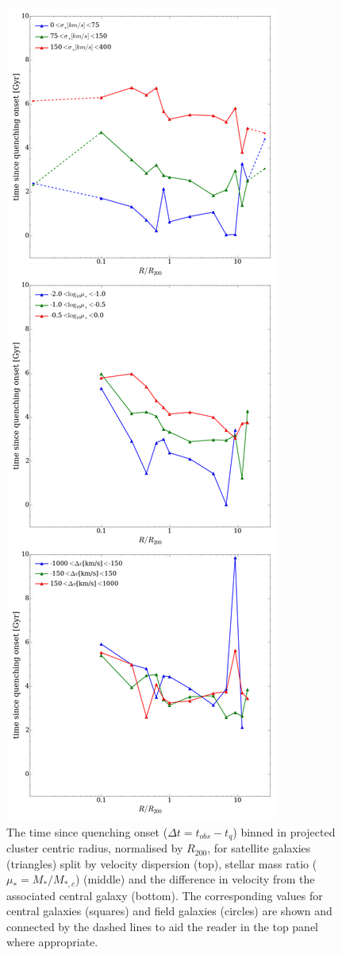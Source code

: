 \documentclass[useAMS,usenatbib]{mn2e}
\begin{document}
\begin{figure}
\includegraphics[height=0.875\textheight]{time_since_quenching_v_disp_mu_bins_delv.png}
\caption{The time since quenching onset ($\Delta t = t_{obs} - t_{q}$) binned in projected cluster centric radius, normalised by $R_{200}$, for satellite galaxies (triangles) split by velocity dispersion (top), stellar mass ratio ($\mu_* = M_*/M_{*,c}$) (middle) and the difference in velocity from the associated central galaxy (bottom). The corresponding values for central galaxies (squares) and field galaxies (circles) are shown and connected by the dashed lines to aid the reader in the top panel where appropriate.}
\label{fig:timesinceradiusvel}
\end{figure}
\end{document}
